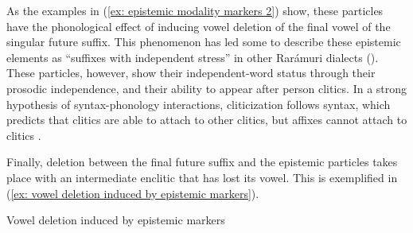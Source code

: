 As the examples in (\ref{ex: epistemic modality markers 2}) show, these particles have the phonological effect of inducing vowel deletion of the final vowel of the singular future suffix. This phenomenon has led some to describe these epistemic elements as ``suffixes with independent stress'' in other Rarámuri dialects (\citealt{Burgess-1984}). These particles, however, show their independent-word status through their prosodic independence, and their ability to appear after person clitics. In a strong hypothesis of syntax-phonology interactions, cliticization follows syntax, which predicts that clitics are able to attach to other clitics, but affixes cannot attach to clitics \parencite{zwicky1983cliticization}.

Finally, deletion between the final future suffix and the epistemic particles takes place with an intermediate enclitic that has lost its vowel. This is exemplified in (\ref{ex: vowel deletion induced by epistemic markers}).

\ea\label{ex: vowel deletion induced by epistemic markers}
{Vowel deletion induced by epistemic markers}

\newpage
    \z
\z

